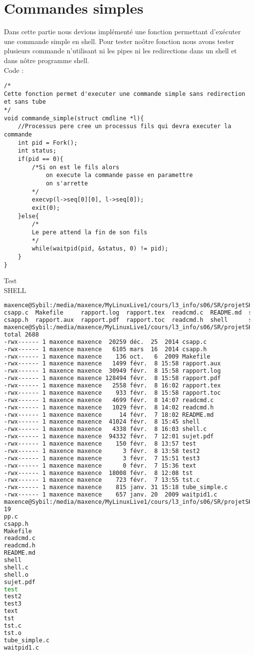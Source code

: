 \documentclass{report}
\begin{document}
		\section{Commandes simples}
		Dans cette partie nous devions impl\'ement\'e une fonction permettant d'ex\'ecuter une commande simple en shell. Pour tester no\^otre fonction nous avons tester plusieurs commande n'utilisant ni les pipes ni les redirections dans un shell et dans n\^otre programme shell. \\
		Code :
		\begin{lstlisting}
/*
Cette fonction permet d'executer une commande simple sans redirection et sans tube
*/
void commande_simple(struct cmdline *l){
	//Processus pere cree un processus fils qui devra executer la commande
	int pid = Fork();
	int status;
	if(pid == 0){
		/*Si on est le fils alors
			on execute la commande passe en paramettre
			on s'arrette
		*/
		execvp(l->seq[0][0], l->seq[0]);
		exit(0);
	}else{
		/*
		Le pere attend la fin de son fils
		*/
		while(waitpid(pid, &status, 0) != pid);
	}
}
		\end{lstlisting} 
		Test \\ SHELL
		\begin{lstlisting}[frame=single,basicstyle=\footnotesize,language=bash]
maxence@Sybil:/media/maxence/MyLinuxLive1/cours/l3_info/s06/SR/projetSHELL$ ls
csapp.c  Makefile     rapport.log  rapport.tex  readcmd.c  README.md  shell.c    test   test3  tst    tube_simple.c
csapp.h  rapport.aux  rapport.pdf  rapport.toc  readcmd.h  shell      sujet.pdf  test2  text   tst.c  waitpid1.c
maxence@Sybil:/media/maxence/MyLinuxLive1/cours/l3_info/s06/SR/projetSHELL$ ls -l
total 2688
-rwx------ 1 maxence maxence  20259 déc.  25  2014 csapp.c
-rwx------ 1 maxence maxence   6105 mars  16  2014 csapp.h
-rwx------ 1 maxence maxence    136 oct.   6  2009 Makefile
-rwx------ 1 maxence maxence   1499 févr.  8 15:58 rapport.aux
-rwx------ 1 maxence maxence  30949 févr.  8 15:58 rapport.log
-rwx------ 1 maxence maxence 128494 févr.  8 15:58 rapport.pdf
-rwx------ 1 maxence maxence   2558 févr.  8 16:02 rapport.tex
-rwx------ 1 maxence maxence    933 févr.  8 15:58 rapport.toc
-rwx------ 1 maxence maxence   4699 févr.  8 14:07 readcmd.c
-rwx------ 1 maxence maxence   1029 févr.  8 14:02 readcmd.h
-rwx------ 1 maxence maxence     14 févr.  7 18:02 README.md
-rwx------ 1 maxence maxence  41024 févr.  8 15:45 shell
-rwx------ 1 maxence maxence   4338 févr.  8 16:03 shell.c
-rwx------ 1 maxence maxence  94332 févr.  7 12:01 sujet.pdf
-rwx------ 1 maxence maxence    150 févr.  8 13:57 test
-rwx------ 1 maxence maxence      3 févr.  8 13:58 test2
-rwx------ 1 maxence maxence      3 févr.  7 15:51 test3
-rwx------ 1 maxence maxence      0 févr.  7 15:36 text
-rwx------ 1 maxence maxence  18008 févr.  8 12:08 tst
-rwx------ 1 maxence maxence    723 févr.  7 13:55 tst.c
-rwx------ 1 maxence maxence    815 janv. 31 15:18 tube_simple.c
-rwx------ 1 maxence maxence    657 janv. 20  2009 waitpid1.c
maxence@Sybil:/media/maxence/MyLinuxLive1/cours/l3_info/s06/SR/projetSHELL$ cat test
19
pp.c
csapp.h
Makefile
readcmd.c
readcmd.h
README.md
shell
shell.c
shell.o
sujet.pdf
test
test2
test3
text
tst
tst.c
tst.o
tube_simple.c
waitpid1.c
		\end{lstlisting}
\end{document}
